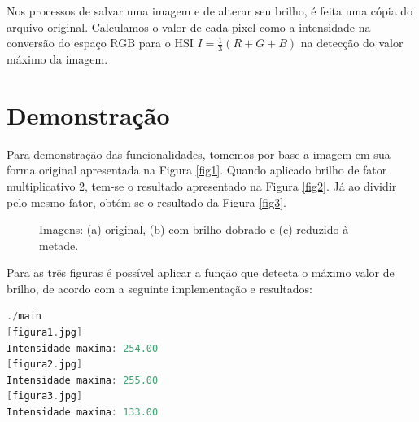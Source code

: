 \documentclass[a4paper, 10pt, conference]{ieeeconf}
\begin{document}
Nos processos de salvar uma imagem e de alterar seu brilho, é feita uma cópia do arquivo original. Calculamos o valor de cada pixel como a intensidade na conversão do espaço RGB para o HSI $I=\frac{1}{3}(R+G+B)$ \cite{rgb} na detecção do valor máximo da imagem.

\section{Demonstração}


Para demonstração das funcionalidades, tomemos por base a imagem em sua forma original apresentada na Figura \ref{fig1}. Quando aplicado brilho de fator multiplicativo 2, tem-se o resultado apresentado na Figura \ref{fig2}. Já ao dividir pelo mesmo fator, obtém-se o resultado da Figura \ref{fig3}.

\begin{figure}[h]
	\centering
	\hspace{0.05cm}
	\hspace{0.05cm}
	\caption{Imagens: (a) original, (b) com brilho dobrado e (c) reduzido à metade.}
	\label{comp}
\end{figure}

Para as três figuras é possível aplicar a função que detecta o máximo valor de brilho, de acordo com a seguinte implementação e resultados:
\newline
\newline
\newline
\begin{lstlisting}[language=C, basicstyle=\footnotesize, frame=single]
./main
[figura1.jpg]
Intensidade maxima: 254.00
[figura2.jpg]
Intensidade maxima: 255.00
[figura3.jpg]
Intensidade maxima: 133.00
\end{lstlisting}
\end{document}
